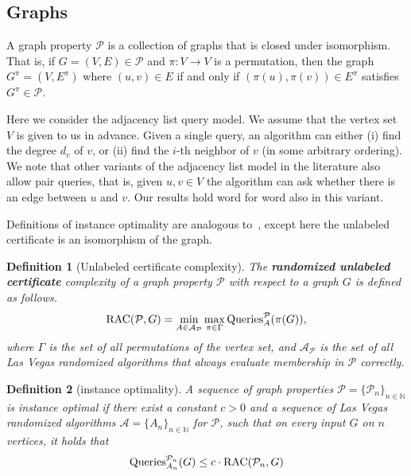 \documentclass[11pt]{article}
\numberwithin{equation}{section}
\newtheorem{definition}[definition]{Definition}
\newcommand{\Query}{\text{Queries}}
\newcommand{\N}{\mathbb N}
\renewcommand{\P}{\mathcal{P}}
\newcommand{\1}{\mathbf{1}}
\newcommand{\A}{\mathcal A}
\begin{document}
\subsection{Graphs}


A graph property $\P$ is a collection of graphs that is closed under isomorphism. That is, if $G = (V,E) \in \P$ and $\pi \colon V \to V$ is a permutation, then the graph $G^\pi = (V,E^\pi)$ where $(u,v) \in E$ if and only if $(\pi(u), \pi(v)) \in E^{\pi}$ satisfies $G^{\pi} \in \P$.


Here we consider the adjacency list query model. We assume that the vertex set $V$ is given to us in advance. Given a single query, an algorithm can either (i) find the degree $d_v$ of $v$, or (ii) find the $i$-th neighbor of $v$ (in some arbitrary ordering). We note that other variants of the adjacency list model in the literature also allow pair queries, that is, given $u,v\in V$ the algorithm can ask whether there is an edge between $u$ and $v$. Our results hold word for word also in this variant.








Definitions of instance optimality are analogous to~, except here the unlabeled certificate is an isomorphism of the graph.

\begin{definition}[Unlabeled certificate complexity]
  The \textbf{randomized unlabeled certificate} complexity of a graph property $\P$ with respect to a graph $G$ is defined as follows.
  \begin{align*}
    \RACC(\P, G) =  \min_{A \in \A_\P} \max_{\pi \in \Gamma} 
    \Query^\P_A(\pi(G)),
\end{align*}
  where $\Gamma$ is the set of all permutations of the vertex set, and $\A_\P$ is the set of all Las Vegas randomized algorithms that always evaluate membership in $\P$ correctly.
\end{definition}

\begin{definition}[instance optimality]
  A sequence of graph properties $\P=\{\P_n\}_{n\in \N}$ is \emph{instance optimal} if there exist a constant $c > 0$ and a sequence of Las Vegas randomized algorithms
  $\A = \{A_n\}_{n\in \N}$ for $\P$, such that on every input $G$ on $n$ vertices, it holds that
  \begin{align*}
    \Query^{\P_n}_{A_n}(G) \leq c \cdot \RACC(\mathcal{P}_n,G)
  \end{align*}
\end{definition}
\end{document}
